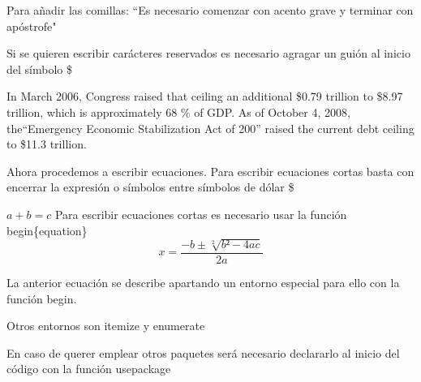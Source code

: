 \documentclass{article}
\begin{document}
	Para añadir las comillas: ``Es necesario comenzar con acento grave y terminar con apóstrofe"
	
	Si se quieren escribir carácteres reservados es necesario agragar un guión al inicio del símbolo
	\$
	
	In March 2006, Congress raised that ceiling an additional \$0.79 trillion to \$8.97 trillion, which is 	    approximately 68 \% of GDP. As of October 4, 2008, the``Emergency Economic Stabilization Act of 200'' raised the current debt ceiling to \$11.3 trillion.
	
	Ahora procedemos a escribir ecuaciones.
	Para escribir ecuaciones cortas basta con encerrar la expresión o símbolos entre símbolos de dólar \$
	
$a+b=c$
Para escribir ecuaciones cortas es necesario usar la función begin\{equation\}
\begin{equation}
x=\frac{-b \pm \sqrt[2]{b²-4ac}}{2a}
\end{equation}

La anterior ecuación se describe apartando un entorno especial para ello con la función begin. 

Otros entornos son itemize y enumerate

En caso de querer emplear otros paquetes será necesario declararlo al inicio del código con la función usepackage
\end{document}
